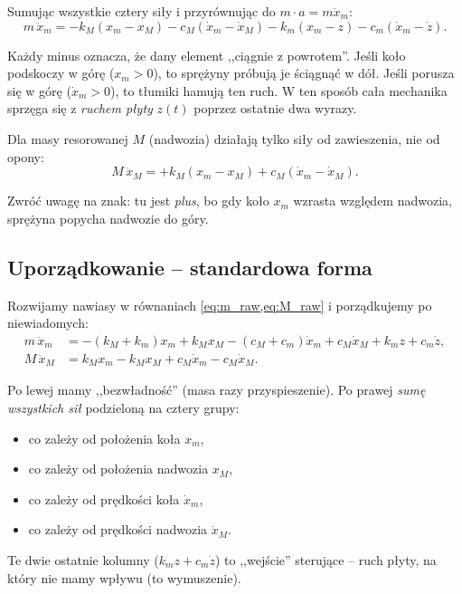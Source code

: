 \documentclass[11pt,a4paper]{article}
\theoremstyle{plainpol}
\begin{document}
Sumując wszystkie cztery siły i przyrównując do $m\cdot a = m\ddot{x}_m$:
\begin{equation}
  m\,\ddot{x}_m = -k_M(x_m - x_M) - c_M(\dot{x}_m - \dot{x}_M)
                  - k_m(x_m - z) - c_m(\dot{x}_m - \dot{z}).
  \label{eq:m_raw}
\end{equation}

\begin{intuicja}
Każdy minus oznacza, że dany element ,,ciągnie z powrotem''. Jeśli koło
podskoczy w górę ($x_m > 0$), to sprężyny próbują je ściągnąć w dół.
Jeśli porusza się w górę ($\dot{x}_m > 0$), to tłumiki hamują ten ruch.
W ten sposób cała mechanika sprzęga się z \emph{ruchem płyty} $z(t)$
poprzez ostatnie dwa wyrazy.
\end{intuicja}

Dla masy resorowanej $M$ (nadwozia) działają tylko siły od zawieszenia,
nie od opony:
\begin{equation}
  M\,\ddot{x}_M = +k_M(x_m - x_M) + c_M(\dot{x}_m - \dot{x}_M).
  \label{eq:M_raw}
\end{equation}

Zwróć uwagę na znak: tu jest \emph{plus}, bo gdy koło $x_m$ wzrasta
względem nadwozia, sprężyna popycha nadwozie do góry.

\subsection{Uporządkowanie -- standardowa forma}

Rozwijamy nawiasy w równaniach \cref{eq:m_raw,eq:M_raw} i porządkujemy
po niewiadomych:
\begin{equation}
\boxed{\begin{aligned}
  m\,\ddot{x}_m &= -(k_M+k_m)x_m + k_Mx_M -(c_M+c_m)\dot{x}_m + c_M\dot{x}_M + k_m z + c_m \dot{z}, \\
  M\,\ddot{x}_M &= k_Mx_m - k_Mx_M + c_M\dot{x}_m - c_M\dot{x}_M.
\end{aligned}}
\label{eq:uklad}
\end{equation}

\begin{intuicja}
Po lewej mamy ,,bezwładność'' (masa razy przyspieszenie). Po prawej
\emph{sumę wszystkich sił} podzieloną na cztery grupy:
\begin{itemize}
  \item co zależy od położenia koła $x_m$,
  \item co zależy od położenia nadwozia $x_M$,
  \item co zależy od prędkości koła $\dot{x}_m$,
  \item co zależy od prędkości nadwozia $\dot{x}_M$.
\end{itemize}
Te dwie ostatnie kolumny ($k_m z + c_m \dot{z}$) to ,,wejście''
sterujące -- ruch płyty, na który nie mamy wpływu (to wymuszenie).
\end{intuicja}
\end{document}
